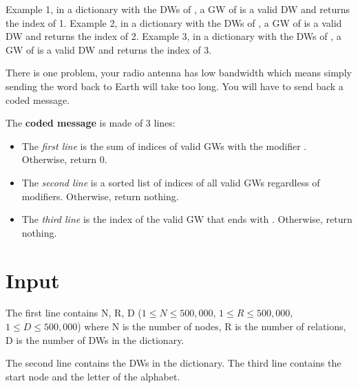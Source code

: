 \begin{flushleft}
    Example 1, in a dictionary with the DWs of , a GW of  is a valid DW and returns the index of 1. Example 2, in a dictionary with the DWs of , a GW of  is a valid DW and returns the index of 2. Example 3, in a dictionary with the DWs of , a GW of  is a valid DW and returns the index of 3.\\
\end{flushleft}

\begin{flushleft}
    There is one problem, your radio antenna has low bandwidth which means simply sending the word back to Earth will take too long. You will have to send back a coded message. \\
\end{flushleft}

\begin{flushleft}
    The \textbf{coded message} is made of 3 lines:
    \begin{itemize}
        \item The \textit{first line} is the sum of indices of valid GWs with the modifier \code{+}. Otherwise, return 0.

        \item The \textit{second line} is a sorted list of indices of all valid GWs regardless of modifiers. Otherwise, return nothing.

        \item The \textit{third line} is the index of the valid GW that ends with . Otherwise, return nothing.
    \end{itemize}
\end{flushleft}

\section*{Input}

\begin{flushleft}
    The first line contains N, R, D ($1 \leq N \leq 500,000$, $1 \leq R \leq 500,000$, $1 \leq D \leq 500,000$) where N is the number of nodes, R is the number of relations, D is the number of DWs in the dictionary. \\
\end{flushleft}

\begin{flushleft}
    The second line contains the DWs in the dictionary. The third line contains the start node and the letter of the alphabet. \\
\end{flushleft}

